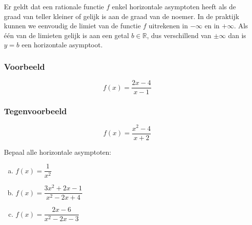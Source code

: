 \documentclass[12pt]{article}
\begin{document}
\begin{theorie}
Er geldt dat een rationale functie $f$ enkel horizontale asymptoten heeft als de graad van teller kleiner of gelijk is aan de graad van de noemer. In de praktijk kunnen we eenvoudig de limiet van de functie $f$ uitrekenen in $-\infty$ en in $+\infty$. Als één van de limieten gelijk is aan een getal $b\in\mathbb{R}$, dus verschillend van $\pm\infty$ dan is $y=b$ een horizontale asymptoot.

\subsubsection*{Voorbeeld}
$$f(x)=\dfrac{2x-4}{x-1}$$

\subsubsection*{Tegenvoorbeeld}
$$f(x)=\dfrac{x^2-4}{x+2}$$

\end{theorie}

\begin{oefening}
Bepaal alle horizontale asymptoten:
\begin{enumerate}[(a)]
  \itemsep.5em
  \item $f(x)=\dfrac{1}{x^2}$
  \item $f(x)=\dfrac{3x^2+2x-1}{x^2-2x+4}$
  \item $f(x)=\dfrac{2x-6}{x^2-2x-3}$
\end{enumerate}
\end{oefening}
\end{document}
